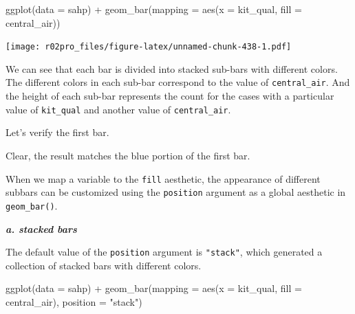 \documentclass[
]{book}
\newenvironment{Shaded}{\begin{snugshade}}{\end{snugshade}}
\newcommand{\AttributeTok}[1]{\textcolor[rgb]{0.77,0.63,0.00}{#1}}
\newcommand{\CommentTok}[1]{\textcolor[rgb]{0.56,0.35,0.01}{\textit{#1}}}
\newcommand{\FunctionTok}[1]{\textcolor[rgb]{0.00,0.00,0.00}{#1}}
\newcommand{\NormalTok}[1]{#1}
\newcommand{\SpecialCharTok}[1]{\textcolor[rgb]{0.00,0.00,0.00}{#1}}
\newcommand{\StringTok}[1]{\textcolor[rgb]{0.31,0.60,0.02}{#1}}
\begin{document}
\begin{Shaded}
\begin{Highlighting}[]
\FunctionTok{ggplot}\NormalTok{(}\AttributeTok{data =}\NormalTok{ sahp) }\SpecialCharTok{+} \FunctionTok{geom\_bar}\NormalTok{(}\AttributeTok{mapping =} \FunctionTok{aes}\NormalTok{(}\AttributeTok{x =}\NormalTok{ kit\_qual, }\AttributeTok{fill =}\NormalTok{ central\_air))}
\end{Highlighting}
\end{Shaded}

\texttt{[image: r02pro\_files/figure-latex/unnamed-chunk-438-1.pdf]}

We can see that each bar is divided into stacked sub-bars with different colors. The different colors in each sub-bar correspond to the value of \texttt{central\_air}. And the height of each sub-bar represents the count for the cases with a particular value of \texttt{kit\_qual} and another value of \texttt{central\_air}.

Let's verify the first bar.

\begin{Shaded}
\end{Shaded}

Clear, the result matches the blue portion of the first bar.

When we map a variable to the \texttt{fill} aesthetic, the appearance of different subbars can be customized using the \texttt{position} argument as a global aesthetic in \texttt{geom\_bar()}.

\textbf{\emph{a. stacked bars}}

The default value of the \texttt{position} argument is \texttt{"stack"}, which generated a collection of stacked bars with different colors.

\begin{Shaded}
\begin{Highlighting}[]
\FunctionTok{ggplot}\NormalTok{(}\AttributeTok{data =}\NormalTok{ sahp) }\SpecialCharTok{+} \FunctionTok{geom\_bar}\NormalTok{(}\AttributeTok{mapping =} \FunctionTok{aes}\NormalTok{(}\AttributeTok{x =}\NormalTok{ kit\_qual, }\AttributeTok{fill =}\NormalTok{ central\_air), }\AttributeTok{position =} \StringTok{"stack"}\NormalTok{)}
\end{Highlighting}
\end{Shaded}
\end{document}
